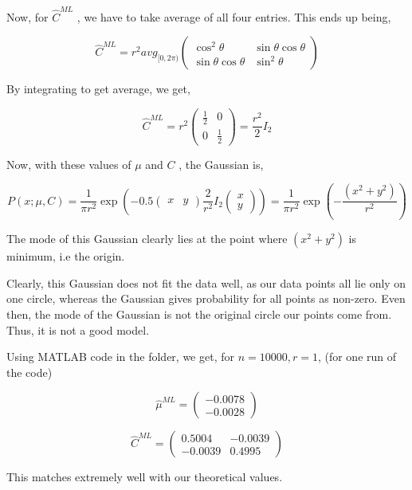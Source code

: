 \documentclass[12pt]{article}
\begin{document}
\begin{enumerate}
	Now, for $\hat{C}^{ML}$ , we have to take average of all four entries. This ends up being, 
	
	$$\hat{C}^{ML} = r^2 avg_{[0,2\pi)}  \begin{pmatrix}
	\cos^2\theta & \sin\theta\cos\theta \\
	\sin\theta\cos\theta & \sin^2\theta
	\end{pmatrix}$$
	
	By integrating to get average, we get,
	
	$$\hat{C}^{ML} = r^2 \begin{pmatrix}
	\frac{1}{2} & 0 \\
	0 & \frac{1}{2}
	\end{pmatrix} = \frac{r^2}{2} I_2 $$
	
	Now, with these values of $\mu$ and $C$ , the Gaussian is,
	
	$$
		P(x;\mu,C) = \frac{1}{\pi r^2} \exp(-0.5 \begin{pmatrix}
			x & y
		\end{pmatrix} \frac{2}{r^2} I_2 \begin{pmatrix}
			x \\
			y
		\end{pmatrix} ) 
		= \frac{1}{\pi r^2} \exp(-\frac{(x^2+y^2)}{r^2})		
	$$
	
	The mode of this Gaussian clearly lies at the point where $(x^2+y^2)$ is minimum, i.e the origin.
	
	Clearly, this Gaussian does not fit the data well, as our data points all lie only on one circle, whereas the Gaussian gives probability for all points as non-zero. Even then, the mode of the Gaussian is not the original circle our points come from. Thus, it is not a good model.
	
	
	Using MATLAB code in the folder, we get, for $n=10000, r=1$, (for one run of the code)
	
	$$ \hat{\mu}^{ML} = \begin{pmatrix}
		-0.0078 \\
		-0.0028
	\end{pmatrix}$$
	
	$$\hat{C}^{ML} = \begin{pmatrix}
	0.5004 & -0.0039 \\
	-0.0039 & 0.4995
	\end{pmatrix}$$
	
	This matches extremely well with our theoretical values.
	 
\end{enumerate}
\end{document}
